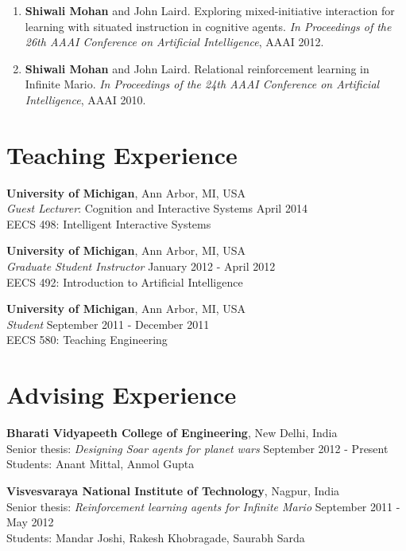 \documentclass[margin,line,11pt]{res}
\begin{document}
\begin{resume}
\begin{enumerate}[label=\lbrack A\arabic*\rbrack,leftmargin=*]
\item \textbf{Shiwali Mohan} and John Laird. Exploring mixed-initiative interaction for learning with situated instruction in cognitive agents. \emph{In Proceedings of the 26th AAAI Conference on Artificial Intelligence}, AAAI 2012.

\item \textbf{Shiwali Mohan} and John Laird. Relational reinforcement learning in Infinite Mario. \emph{In Proceedings of the
24th AAAI Conference on Artificial Intelligence}, AAAI 2010.
\end{enumerate}

\section{\sc Teaching Experience}
\textbf{University of Michigan}, Ann Arbor, MI, USA \\
\emph{Guest Lecturer}: Cognition and Interactive Systems \hfill April 2014 \\
EECS 498: Intelligent Interactive Systems

\textbf{University of Michigan}, Ann Arbor, MI, USA \\
\emph{Graduate Student Instructor} \hfill January 2012 - April 2012 \\
EECS 492: Introduction to Artificial Intelligence

\textbf{University of Michigan}, Ann Arbor, MI, USA \\
\emph{Student}  \hfill September 2011 - December 2011\\
EECS 580: Teaching Engineering

\section{\sc Advising Experience}
\textbf{Bharati Vidyapeeth College of Engineering}, New Delhi, India\\
Senior thesis: \emph{Designing Soar agents for planet wars} \hfill September 2012 - Present\\
Students: Anant Mittal, Anmol Gupta

\textbf{Visvesvaraya National Institute of Technology}, Nagpur, India\\
Senior thesis: \emph{Reinforcement learning agents for Infinite Mario} \hfill September 2011 - May 2012\\
Students: Mandar Joshi, Rakesh Khobragade, Saurabh Sarda\\


\end{resume}
\end{document}
